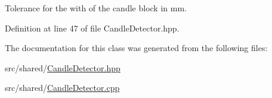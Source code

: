 Tolerance for the with of the candle block in mm. 



Definition at line 47 of file Candle\-Detector.\-hpp.



The documentation for this class was generated from the following files\-:\begin{DoxyCompactItemize}
\item 
src/shared/\hyperlink{CandleDetector_8hpp}{Candle\-Detector.\-hpp}\item 
src/shared/\hyperlink{CandleDetector_8cpp}{Candle\-Detector.\-cpp}\end{DoxyCompactItemize}
